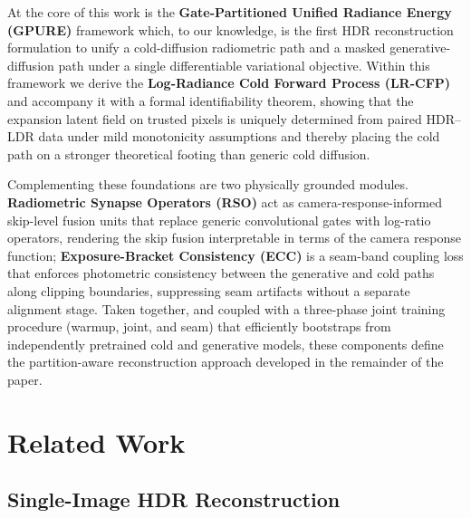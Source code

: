 \documentclass[10pt,twocolumn,letterpaper]{article}
\begin{document}
At the core of this work is the \textbf{Gate-Partitioned Unified Radiance Energy (GPURE)} framework which, to our knowledge, is the first HDR reconstruction formulation to unify a cold-diffusion radiometric path and a masked generative-diffusion path under a single differentiable variational objective. Within this framework we derive the \textbf{Log-Radiance Cold Forward Process (LR-CFP)} and accompany it with a formal identifiability theorem, showing that the expansion latent field on trusted pixels is uniquely determined from paired HDR--LDR data under mild monotonicity assumptions and thereby placing the cold path on a stronger theoretical footing than generic cold diffusion.

Complementing these foundations are two physically grounded modules. \textbf{Radiometric Synapse Operators (RSO)} act as camera-response-informed skip-level fusion units that replace generic convolutional gates with log-ratio operators, rendering the skip fusion interpretable in terms of the camera response function; \textbf{Exposure-Bracket Consistency (ECC)} is a seam-band coupling loss that enforces photometric consistency between the generative and cold paths along clipping boundaries, suppressing seam artifacts without a separate alignment stage. Taken together, and coupled with a three-phase joint training procedure (warmup, joint, and seam) that efficiently bootstraps from independently pretrained cold and generative models, these components define the partition-aware reconstruction approach developed in the remainder of the paper.

\section{Related Work}
\label{sec:related}

\subsection{Single-Image HDR Reconstruction}
\end{document}
